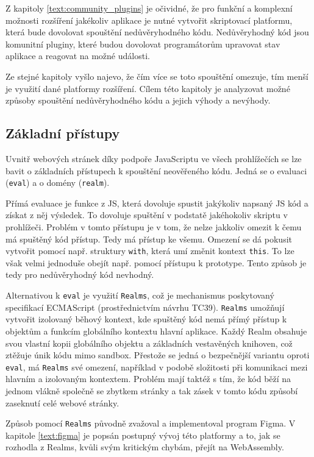 Z kapitoly \ref{text:community_plugins} je očividné, že pro funkční a komplexní možnosti rozšíření jakékoliv aplikace je nutné vytvořit skriptovací platformu, která bude dovolovat spouštění nedůvěryhodného kódu.
Nedůvěryhodný kód jsou komunitní pluginy, které budou dovolovat programátorům upravovat stav aplikace a reagovat na možné události.

Ze stejné kapitoly vyšlo najevo, že čím více se toto spouštění omezuje, tím menší je využití dané platformy rozšíření.
Cílem této kapitoly je analyzovat možné způsoby spouštění nedůvěryhodného kódu a jejich výhody a nevýhody.

\subsection{Základní přístupy}

Uvnitř webových stránek díky podpoře JavaScriptu ve všech prohlížečích se lze bavit o základních přístupech k spouštění neověřeného kódu.
Jedná se o evaluaci (\texttt{eval}) a o domény (\texttt{realm}).

Přímá evaluace je funkce z JS, která dovoluje spustit jakýkoliv napsaný JS kód a získat z něj výsledek.
To dovoluje spuštění v podstatě jakéhokoliv skriptu v prohlížeči.
Problém v tomto přístupu je v tom, že nelze jakkoliv omezit k čemu má spuštěný kód přístup.
Tedy má přístup ke všemu.
Omezení se dá pokusit vytvořit pomocí např. struktury \texttt{with}, která umí změnit kontext \texttt{this}.
To lze však velmi jednoduše obejít např. pomocí přístupu k prototype.
Tento způsob je tedy pro nedůvěryhodný kód nevhodný.

Alternativou k \texttt{eval} je využití \texttt{Realms}, což je mechanismus poskytovaný specifikací ECMAScript (prostřednictvím návrhu TC39). 
\texttt{Realms} umožňují vytvořit izolovaný běhový kontext, kde spuštěný kód nemá přímý přístup k objektům a funkcím globálního kontextu hlavní aplikace.
Každý Realm obsahuje svou vlastní kopii globálního objektu a základních vestavěných knihoven, což ztěžuje únik kódu mimo sandbox.
Přestože se jedná o bezpečnější variantu oproti \texttt{eval}, má \texttt{Realms} své omezení, například v podobě složitosti při komunikaci mezi hlavním a izolovaným kontextem. 
Problém mají taktéž s tím, že kód běží na jednom vlákně společně se zbytkem stránky a tak zásek v tomto kódu způsobí zaseknutí celé webové stránky.

Způsob pomocí \texttt{Realms} původně zvažoval a implementoval program Figma.
V kapitole \ref{text:figma} je popsán postupný vývoj této platformy a to, jak se rozhodla z Realms, kvůli svým kritickým chybám, přejít na WebAssembly.


